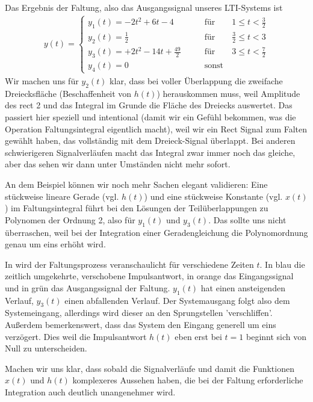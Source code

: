 \begin{Loesung}
Das Ergebnis der Faltung, also das Ausgangssignal unseres LTI-Systems ist
\begin{align}
y(t) =
\begin{cases}
  y_1(t) = -2 t^2 + 6 t - 4 &\qquad \mathrm{für} \qquad 1 \leq t < \frac{3}{2}\\
  y_2(t) = \frac{1}{2}  &\qquad \mathrm{für} \qquad \frac{3}{2} \leq t < 3\\
  y_3(t) = +2 t^2 - 14 t + \frac{49}{2} &\qquad \mathrm{für} \qquad 3 \leq t < \frac{7}{2}\\
  y_4(t)=0 &\qquad \mathrm{sonst}
\end{cases}
\end{align}
%
Wir machen uns für $y_2(t)$ klar, dass bei voller Überlappung die
zweifache Dreiecksfläche
(Beschaffenheit von $h(t)$) herauskommen muss, weil Amplitude des rect 2 und
das Integral im Grunde die Fläche des Dreiecks auswertet.
%
Das passiert hier speziell und intentional (damit wir ein Gefühl bekommen, was
die Operation Faltungsintegral eigentlich macht),
weil wir ein Rect Signal zum Falten gewählt haben,
das vollständig mit dem Dreieck-Signal überlappt.
%
Bei anderen schwierigeren Signalverläufen macht das Integral zwar immer noch
das gleiche, aber das sehen wir dann unter Umständen nicht mehr sofort.

An dem Beispiel können wir noch mehr Sachen elegant validieren:
Eine stückweise lineare Gerade (vgl. $h(t)$) und eine stückweise Konstante (vgl. $x(t)$)
im Faltungsintegral führt
bei den Lösungen der Teilüberlappungen zu Polynomen der Ordnung 2, also für
$y_1(t)$ und $y_3(t)$. Das sollte uns nicht überraschen,
weil bei der Integration einer Geradengleichung die Polynomordnung genau um eins
erhöht wird.
%

In  wird der Faltungsprozess veranschaulicht für verschiedene
Zeiten $t$. In blau die zeitlich umgekehrte, verschobene Impulsantwort, in
orange das Eingangssignal und in grün das Ausgangssignal der Faltung.
%
$y_1(t)$ hat einen ansteigenden Verlauf, $y_3(t)$ einen abfallenden Verlauf.
Der Systemausgang folgt also dem Systemeingang, allerdings wird dieser an den
Sprungstellen 'verschliffen'.
%
Außerdem bemerkenswert, dass das System den Eingang generell um eins verzögert.
Dies weil die Impulsantwort $h(t)$ eben erst bei $t=1$ beginnt sich von Null
zu unterscheiden.
%

Machen wir uns klar, dass sobald die Signalverläufe und damit die Funktionen
$x(t)$ und $h(t)$ komplexeres Aussehen haben, die bei der Faltung erforderliche
Integration auch deutlich unangenehmer wird.

\end{Loesung}



